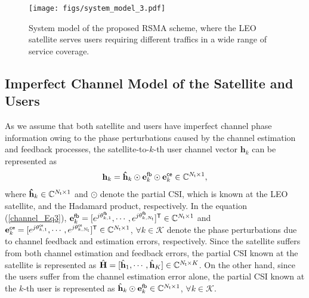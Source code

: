 \documentclass[draftclsnofoot, onecolumn, comsoc, 12pt]{IEEEtran}
\begin{document}
\begin{figure}[!t]
\centering
 		\texttt{[image: figs/system\_model\_3.pdf]}%
 		\caption{{System model of the proposed RSMA scheme, where the LEO satellite serves users requiring different traffics in a wide range of service coverage.}}
    	\label{Fig1}%
\end{figure}

\subsection{Imperfect Channel Model of the Satellite and Users}

As we assume that both satellite and users have imperfect channel phase information owing to the phase perturbations caused by the channel estimation and feedback processes, the satellite-to-$k$-th user channel vector $\mathbf{h}_k$ can be represented as
\begin{align}\label{channel_Eq3}
\mathbf{h}_k = \mathbf{\hat{h}}_k \odot {\mathbf{e}_{k}^{\sf{fb}}} \odot {\mathbf{e}_{k}^{\sf{ce}}} \in \mathbb{C}^{{N_{\sf{t}}}\times{1}}, 
\end{align}
{where $\mathbf{\hat{h}}_k\in \mathbb{C}^{{N_{\sf{t}}}\times{1}}$ and $\odot$ denote the partial CSI, which is known at the LEO satellite, and the Hadamard product, respectively.} In the equation (\ref{channel_Eq3}), ${\mathbf{e}_{k}^{\sf{fb}}} = [e^{j\theta_{k,1}^{\sf{fb}}}, \cdots, e^{j\theta_{k, N_{{\sf{t}}}}^{\sf{fb}}}]^{\sf{T}}\in \mathbb{C}^{{N_{\sf{t}}}\times{1}}$ and ${\mathbf{e}_{k}^{\sf{ce}}} = [e^{j\theta_{k,1}^{\sf{ce}}}, \cdots, e^{j\theta_{k, N_{{\sf{t}}}}^{\sf{ce}}}]^{\sf{T}}\in \mathbb{C}^{{N_{\sf{t}}}\times{1}}$, $\forall k \in \mathcal{K}$ 
denote the phase perturbations due to channel feedback and estimation errors, respectively. 
Since the satellite suffers from both channel estimation and feedback errors, the partial CSI known at the satellite is represented as 
$\hat{\mathbf{H}} = [\hat{\mathbf{h}}_1, \cdots, \hat{\mathbf{h}}_K]\in \mathbb{C}^{{N_{\sf{t}}}\times{K}}$. 
On the other hand, since the users suffer from the channel estimation error alone, the partial CSI known at the $k$-th user is represented as 
$\hat{\mathbf{h}}_k \odot \mathbf{e}_{k}^{\sf{fb}} \in \mathbb{C}^{{N_{\sf{t}}}\times{1}}$, $\forall k \in \mathcal{K}$. 
\end{document}
